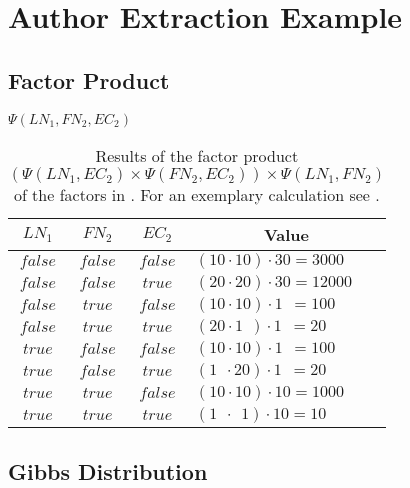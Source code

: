 \chapter{Author Extraction Example}\label{app:cha-author-extraction-example}
\section{Factor Product}\label{app:sec-factor-product}
\begin{table}[H]
\centering
$\Psi(LN_1,FN_2,EC_2)$\par
\smallskip
\begin{tabular}{c c c l}
 \toprule
 $LN_1$ & $FN_2$ & $EC_2$ & \multicolumn{1}{c}{Value} \\
 \midrule
 $false$ & $false$ & $false$ & $(10\cdot10)\cdot30=3000$\\
 $false$ & $false$ & $true$  & $(20\cdot20)\cdot30=12000$\\
 $false$ & $true$  & $false$ & $(10\cdot10)\cdot1\ \ =100$\\
 $false$ & $true$  & $true$  & $(20\cdot1\ \ )\cdot1\ \ =20$\\
 $true$  & $false$ & $false$ & $(10\cdot10)\cdot1\ \ =100$\\
 $true$  & $false$ & $true$  & $(1\ \ \cdot20)\cdot1\ \ =20$\\
 $true$  & $true$  & $false$ & $(10\cdot10)\cdot10=1000$\\
 $true$  & $true$  & $true$  & $(1\ \ \cdot\ \ 1)\cdot10=10$\\
 \bottomrule
\end{tabular}
\caption{Results of the \gls{factor product} $(\Psi(LN_1,EC_2)\times\Psi(FN_2,EC_2))\times\Psi(LN_1,FN_2)$ of the \glspl{factor} in . For an exemplary calculation see .}
\label{tab:example-factor-product}
\end{table}
\section{Gibbs Distribution}\label{app:sec-gibbs-distribution}
